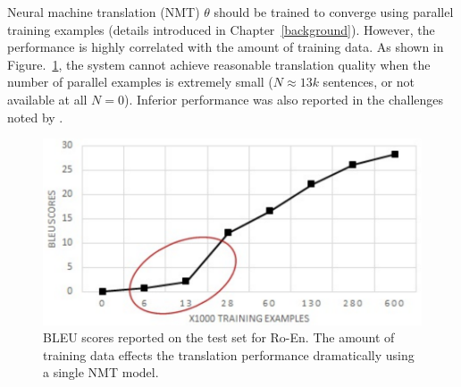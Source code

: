 

Neural machine translation (NMT) $\theta$  should be trained to converge using parallel training examples (details introduced in Chapter~\ref{background}). However, the performance is highly correlated with the amount of training data.  As shown in Figure.~\ref{cp5.fig.data_size}, the system cannot achieve reasonable translation quality when the number of parallel examples is extremely small ($N \approx 13k$ sentences,  or not available at all $N =0$).  Inferior performance was also reported in the challenges noted by .

\begin{figure}[hptb]
	\centering
	\includegraphics[width=0.85\linewidth]{figs/ulr/data_matters.pdf}
\caption{\label{cp5.fig.data_size} BLEU scores reported on the test set for Ro-En. The amount of training data effects the translation performance dramatically using a single NMT model.}
 \end{figure}

